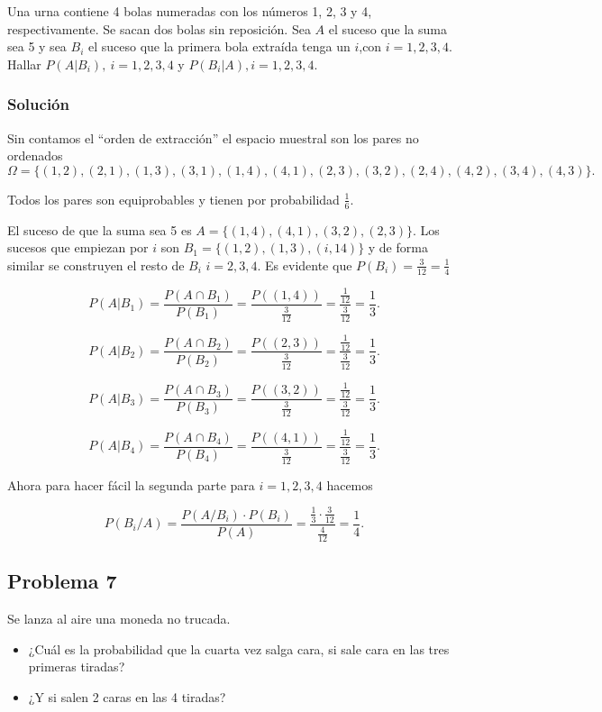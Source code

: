 \documentclass[
]{article}
\providecommand{\tightlist}{%
  \setlength{\itemsep}{0pt}\setlength{\parskip}{0pt}}
\begin{document}
Una urna contiene 4 bolas numeradas con los números 1, 2, 3 y 4,
respectivamente. Se sacan dos bolas sin reposición. Sea \(A\) el suceso
que la suma sea 5 y sea \(B_i\) el suceso que la primera bola extraída
tenga un \(i\),con \(i=1,2,3,4\). Hallar \(P(A|B_i),\  i=1,2,3,4\) y
\(P(B_i|A), i=1,2,3,4\).

\hypertarget{soluciuxf3n-6}{%
\subsubsection{Solución}\label{soluciuxf3n-6}}

Sin contamos el ``orden de extracción'' el espacio muestral son los
pares no ordenados
\[\Omega =\{(1,2),(2,1),(1,3),(3,1),(1,4),(4,1),(2,3),(3,2),(2,4),(4,2),(3,4),(4,3)\}.\]

Todos los pares son equiprobables y tienen por probabilidad
\(\frac{1}{6}.\)

El suceso de que la suma sea 5 es \(A=\{(1,4),(4,1),(3,2),(2,3)\}\). Los
sucesos que empiezan por \(i\) son \(B_1=\{(1,2),(1,3),(i,14)\}\) y de
forma similar se construyen el resto de \(B_i\) \(i=2,3,4\). Es evidente
que \(P(B_i)=\frac{3}{12}=\frac{1}{4}\)

\[
P(A|B_1)=\frac{P(A\cap B_1)}{P(B_1)}=\frac{P((1,4))}{\frac{3}{12}}=
\frac{\frac{1}{12}}{\frac{3}{12}}=\frac{1}{3}.
\]

\[
P(A|B_2)=\frac{P(A\cap B_2)}{P(B_2)}=\frac{P((2,3))}{\frac{3}{12}}=
\frac{\frac{1}{12}}{\frac{3}{12}}=\frac{1}{3}.
\]

\[
P(A|B_3)=\frac{P(A\cap B_3)}{P(B_3)}=\frac{P((3,2))}{\frac{3}{12}}=
\frac{\frac{1}{12}}{\frac{3}{12}}=\frac{1}{3}.
\]

\[P(A|B_4)=\frac{P(A\cap B_4)}{P(B_4)}=\frac{P((4,1))}{\frac{3}{12}}=
\frac{\frac{1}{12}}{\frac{3}{12}}=\frac{1}{3}.\]

Ahora para hacer fácil la segunda parte para \(i=1,2,3,4\) hacemos

\[
P(B_i/A)=\frac{P(A/B_i)\cdot P(B_i)}{P(A)}=\frac{\frac{1}{3}\cdot \frac{3}{12}}{\frac{4}{12}}=\frac{1}{4}.
\]

\hypertarget{problema-7}{%
\subsection{Problema 7}\label{problema-7}}

Se lanza al aire una moneda no trucada.

\begin{itemize}
\tightlist
\item
  ¿Cuál es la probabilidad que la cuarta vez salga cara, si sale cara en
  las tres primeras tiradas?
\item
  ¿Y si salen 2 caras en las 4 tiradas?
\end{itemize}
\end{document}
